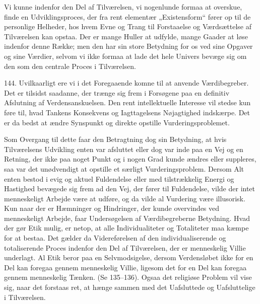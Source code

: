 \documentclass[12pt,a4paper]{book}
\newcommand{\apage}[1]{\marginnote{\footnotesize\textit{[#1]}}}
\begin{document}
Vi kunne indenfor den Del af Tilværelsen, vi nogenlunde formaa at overskue, finde en
Udviklingsproces, der fra rent elementær „Existensform“ fører op til de personlige
Helheder, hos hvem Evne og Trang til Forstaaelse og Værdsættelse af Tilværelsen kan opstaa.
Der er mange Huller at udfylde, mange Gaader at løse indenfor denne Række; men den har sin
store Betydning for os ved sine Opgaver og sine Værdier, selvom vi ikke formaa at lade det
hele Univers bevæge sig om den som den centrale Proces i Tilværelsen.

144. Uvilkaarligt ere vi i det Foregaaende komne til at anvende Værdibegreber. Det er
tilsidst saadanne, der trænge sig frem i Forsøgene paa en definitiv Afslutning af
Verdensanskuelsen. Den rent intellektuelle Interesse vil stedse kun føre til, hvad Tankens
Konsekvens og Iagttagelsens Nøjagtighed indskærpe. Det er da bedst at ændre Synspunkt og
direkte opstille Vurderingsproblemet.

Som Overgang til dette faar den Betragtning dog sin Betydning, at hvis Tilværelsens
Udvikling enten var afsluttet eller dog var inde paa en Vej og en Retning, der ikke paa
noget Punkt og i nogen Grad kunde ændres eller suppleres, saa var det unødvendigt at
opstille et særligt Vurderingsproblem. Dersom Alt enten bestod i evig og aktuel Fuldendelse
eller med tilstrækkelig Energi og Hastighed bevægede sig frem ad den Vej, der fører til
Fuldendelse, vilde der intet menneskeligt Arbejde være at udføre, og da vilde al Vurdering
være illusorisk. Kun naar der er Hæmninger \apage{345} og Hindringer, der kunde overvindes ved
menneskeligt Arbejde, faar Undersøgelsen af Værdibegreberne Betydning. Hvad der gør Etik
mulig, er netop, at alle Individualiteter og Totaliteter maa kæmpe for at bestaa. Det
gælder da Videreførelsen af den individualiserende og totaliserende Proces indenfor den Del
af Tilværelsen, der er menneskelig Villie underlagt. Al Etik beror paa en Selvmodsigelse,
dersom Verdensløbet ikke for en Del kan foregaa gennem menneskelig Villie, ligesom det for
en Del kan foregaa gennem menneskelig Tænken. (Se 135--136). Ogsaa det religiøse Problem
vil vise sig, naar det forstaas ret, at hænge sammen med det Uafsluttede og Uafsluttelige i
Tilværelsen.
\end{document}
